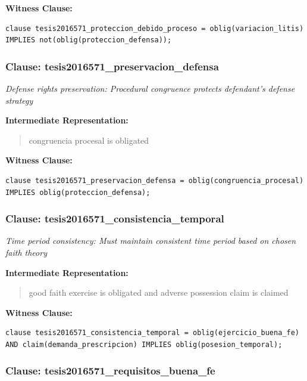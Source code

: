 \documentclass[11pt,a4paper]{article}
\begin{document}
\textbf{Witness Clause:}

\begin{lstlisting}[style=witnessstyle, language=Witness]
clause tesis2016571_proteccion_debido_proceso = oblig(variacion_litis) IMPLIES not(oblig(proteccion_defensa));
\end{lstlisting}

\subsubsection{Clause: tesis2016571\_preservacion\_defensa}

\textit{Defense rights preservation: Procedural congruence protects defendant's defense strategy}

\textbf{Intermediate Representation:}

\begin{quote}
congruencia procesal is obligated
\end{quote}

\textbf{Witness Clause:}

\begin{lstlisting}[style=witnessstyle, language=Witness]
clause tesis2016571_preservacion_defensa = oblig(congruencia_procesal) IMPLIES oblig(proteccion_defensa);
\end{lstlisting}

\subsubsection{Clause: tesis2016571\_consistencia\_temporal}

\textit{Time period consistency: Must maintain consistent time period based on chosen faith theory}

\textbf{Intermediate Representation:}

\begin{quote}
good faith exercise is obligated and adverse possession claim is claimed
\end{quote}

\textbf{Witness Clause:}

\begin{lstlisting}[style=witnessstyle, language=Witness]
clause tesis2016571_consistencia_temporal = oblig(ejercicio_buena_fe) AND claim(demanda_prescripcion) IMPLIES oblig(posesion_temporal);
\end{lstlisting}

\subsubsection{Clause: tesis2016571\_requisitos\_buena\_fe}
\end{document}
